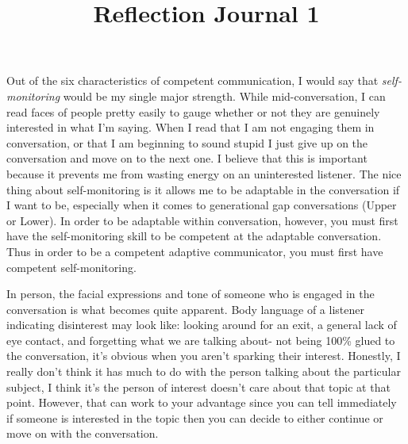\documentclass[12pt]{article}
\begin{document}
\title{Reflection Journal 1}




\par
Out of the six characteristics of competent communication, I would say that \emph{self-monitoring} would be my single major strength. While mid-conversation, I can read faces of people pretty easily to gauge whether or not they are genuinely interested in what I'm saying. When I read that I am not engaging them in conversation, or that I am beginning to sound stupid I just give up on the conversation and move on to the next one. I believe that this is important because it prevents me from wasting energy on an uninterested listener. The nice thing about self-monitoring is it allows me to be adaptable in the conversation if I want to be, especially when it comes to generational gap conversations (Upper or Lower). In order to be adaptable within conversation, however, you must first have the self-monitoring skill to be competent at the adaptable conversation. Thus in order to be a competent adaptive communicator, you must first have competent self-monitoring.
\par 
In person, the facial expressions and tone of someone who is engaged in the conversation is what becomes quite apparent. Body language of a listener indicating disinterest may look like: looking around for an exit, a general lack of eye contact, and forgetting what we are talking about- not being 100\% glued to the conversation, it's obvious when you aren't sparking their interest. Honestly, I really don't think it has much to do with the person talking about the particular subject, I think it's the person of interest doesn't care about that topic at that point. However, that can work to your advantage since you can tell immediately if someone is interested in the topic then you can decide to either continue or move on with the conversation.
\end{document}
